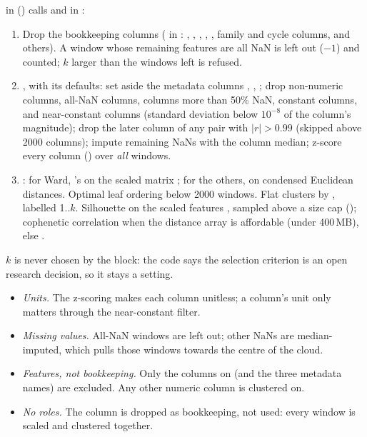  in  () calls
 and  in
:
\begin{enumerate}
\item Drop the bookkeeping columns ( in
  : , , ,
  , , family and cycle columns, and others). A window whose
  remaining features are all NaN is left out ($-1$) and counted; $k$ larger than the windows left
  is refused.
\item {}, with its defaults: set aside the metadata columns
  , , ; drop non-numeric columns,
  all-NaN columns, columns more than 50\% NaN, constant columns, and near-constant columns (standard
  deviation below $10^{-8}$ of the column's magnitude); drop the later column of any pair with
  $|r| > 0.99$ (skipped above 2000 columns); impute remaining NaNs with the column median; z-score
  every column () over \emph{all} windows.
\item {}: for Ward, 's
   on the scaled matrix \citep{ward1963hierarchical}; for the others, on
  condensed Euclidean distances. Optimal leaf ordering below 2000 windows. Flat clusters by
  , labelled 1..$k$. Silhouette on the scaled features
  \citep{rousseeuw1987silhouettes}, sampled above a size cap
  (); cophenetic correlation when the distance array is affordable
  (under 400\,MB), else .
\end{enumerate}
$k$ is never chosen by the block: the code says the selection criterion is an open research
decision, so it stays a setting.

\begin{itemize}
\item \emph{Units.} The z-scoring makes each column unitless; a column's unit only matters through
  the near-constant filter.
\item \emph{Missing values.} All-NaN windows are left out; other NaNs are median-imputed, which
  pulls those windows towards the centre of the cloud.
\item \emph{Features, not bookkeeping.} Only the columns on  (and the three
  metadata names) are excluded. Any other numeric column is clustered on.
\item \emph{No roles.} The  column is dropped as bookkeeping, not used: every window is
  scaled and clustered together.
\end{itemize}

